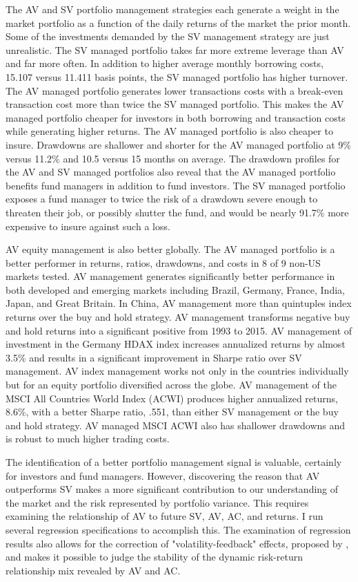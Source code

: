 The AV and SV portfolio management strategies each generate a weight in the market portfolio as a function of the daily returns of the market the prior month. Some of the investments demanded by the SV management strategy are just unrealistic. The SV managed portfolio takes far more extreme leverage than AV and far more often. In addition to higher average monthly borrowing costs, 15.107 versus 11.411 basis points, the SV managed portfolio has higher turnover. The AV managed portfolio generates lower transactions costs with a break-even transaction cost more than twice the SV managed portfolio. This makes the AV managed portfolio cheaper for investors in both borrowing and transaction costs while generating higher returns. The AV managed portfolio is also cheaper to insure. Drawdowns are shallower and shorter for the AV managed portfolio at 9\% versus 11.2\% and 10.5 versus 15 months on average. The drawdown profiles for the AV and SV managed portfolios also reveal that the AV managed portfolio benefits fund managers in addition to fund investors. The SV managed portfolio exposes a fund manager to twice the risk of a drawdown severe enough to threaten their job, or possibly shutter the fund, and would be nearly 91.7\% more expensive to insure against such a loss.

AV equity management is also better globally. The AV managed portfolio is a better performer in returns, ratios, drawdowns, and costs in 8 of 9 non-US markets tested. AV management generates significantly better performance in both developed and emerging markets including Brazil, Germany, France, India, Japan, and Great Britain. In China, AV management more than quintuples index returns over the buy and hold strategy. AV management transforms negative buy and hold returns into a significant positive from 1993 to 2015. AV management of investment in the Germany HDAX index increases annualized returns by almost 3.5\% and results in a significant improvement in Sharpe ratio over SV management. AV index management works not only in the countries individually but for an equity portfolio diversified across the globe. AV management of the MSCI All Countries World Index (ACWI) produces higher annualized returns, 8.6\%, with a better Sharpe ratio, .551, than either SV management or the buy and hold strategy. AV managed MSCI ACWI also has shallower drawdowns and is robust to much higher trading costs. 

The identification of a better portfolio management signal is valuable, certainly for investors and fund managers. However, discovering the reason that AV outperforms SV makes a more significant contribution to our understanding of the market and the risk represented by portfolio variance. This requires examining the relationship of AV to future SV, AV, AC, and returns. I run several regression specifications to accomplish this. The examination of regression results also allows for the correction of "volatility-feedback" effects, proposed by \citet{campbell_no_1992}, and makes it possible to judge the stability of the dynamic risk-return relationship mix revealed by AV and AC.

